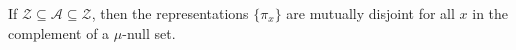 If $\mathcal{Z} \subseteq \mathcal{A} \subseteq \mathcal{Z}$, then the representations $\{\pi_x\}$ are mutually disjoint for all $x$ in the complement of a $\mu$-null set.
